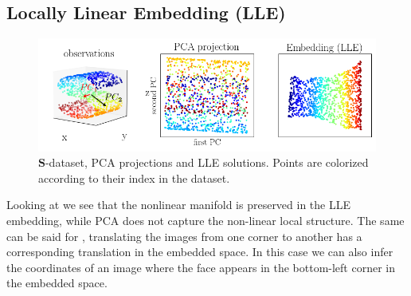 \begin{frame}
\section{Locally Linear Embedding (LLE)}

\begin{figure}[ht]
	\centering
    \includegraphics[width=12cm]{img/s_data_proj.png}
	\caption{$\textbf{S}$-dataset, PCA projections and LLE solutions. Points are colorized according to their index in the dataset.}
	\label{fig:s_data_proj_lle}
\end{figure}


\end{frame}

Looking at  we see that the nonlinear manifold is preserved in the LLE embedding, while PCA does not capture the non-linear local structure. The same can be said for , translating the images from one corner to another has a corresponding translation in the embedded space. In this case we can also infer the coordinates of an image where the face appears in the bottom-left corner in the embedded space.

